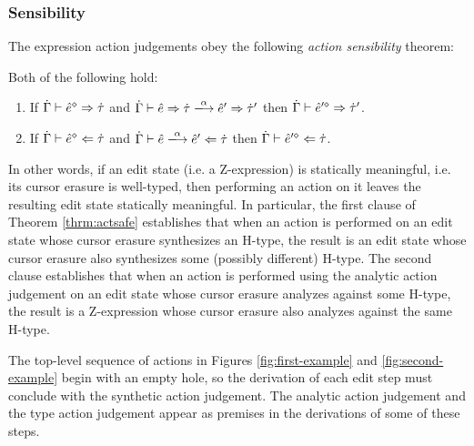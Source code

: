 \subsubsection{Sensibility}
The expression action judgements obey the following \emph{action sensibility} theorem:
\begin{theorem}\label{thrm:actsafe} Both of the following hold:\begin{enumerate}[itemsep=0px,partopsep=0px,topsep=0px]
\item If $\dot{\Gamma} \vdash \hat{e}^{\diamond} \Rightarrow \dot{\tau}$ and $\performSyn{\hGamma}{\zexp}{\htau}{\alpha}{\zexp'}{\htau'}$ 
   then
  $\dot{\Gamma} \vdash \hat{e}'^{\diamond} \Rightarrow \dot{\tau}'$.
\item If $\dot{\Gamma} \vdash \hat{e}^{\diamond} \Leftarrow \dot{\tau}$ and
   $\performAna{\hGamma}{\zexp}{\htau}{\alpha}{\zexp'}$ then
  $\dot{\Gamma} \vdash \hat{e}'^{\diamond} \Leftarrow \dot{\tau}$.
\end{enumerate}
\end{theorem}
\noindent In other words, if an edit state (i.e. a Z-expression) is statically meaningful, i.e. its cursor erasure is well-typed, then performing an action on it leaves the resulting edit state statically meaningful. In particular, the first clause of Theorem \ref{thrm:actsafe} establishes that when an action is performed on an edit state whose cursor erasure synthesizes an H-type, the result is an edit state whose cursor erasure also synthesizes some (possibly different) H-type. The second clause establishes that when an action is performed using the analytic action judgement on an edit state whose cursor erasure analyzes against some H-type, the result is a Z-expression whose cursor erasure also analyzes against the same H-type. %

The top-level sequence of actions in Figures \ref{fig:first-example} and \ref{fig:second-example} begin with an empty hole, so the derivation of each edit step must conclude with the synthetic action judgement. The analytic action judgement and the type action judgement appear as premises in the derivations of some of these steps.

